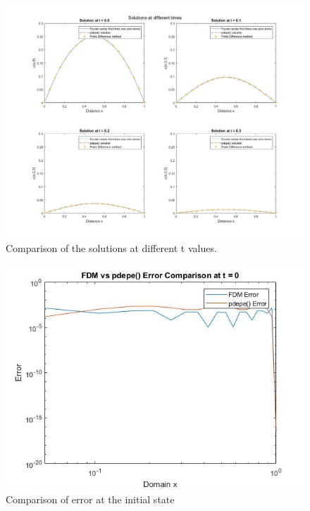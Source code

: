 \documentclass{article}
\begin{document}
\begin{figure}
	\begin{center}
		\includegraphics[width=\textwidth,height=\textheight,keepaspectratio]{MATLAB/B2.jpg}
	\end{center}
	\caption{Comparison of the solutions at different t values.}
\end{figure}
\begin{figure}
	\begin{center}
		\includegraphics[width=\textwidth,height=\textheight,keepaspectratio]{MATLAB/B3.jpg}
	\end{center}
	\caption{Comparison of error at the initial state}
\end{figure}
\newpage
\end{document}
